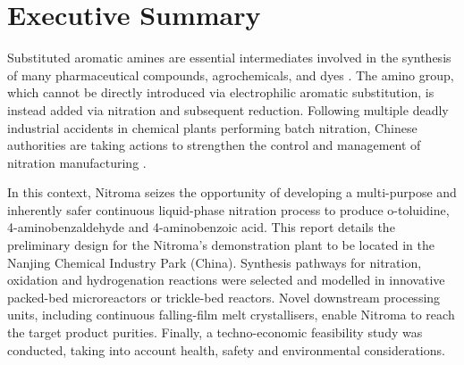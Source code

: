 \section*{Executive Summary}
\label{sec:exec-summary}

\noindent Substituted aromatic amines are essential intermediates involved in the synthesis of many pharmaceutical compounds, agrochemicals, and dyes \cite{vogt_amines_2000}. The amino group, which cannot be directly introduced via electrophilic aromatic substitution, is instead added via nitration and subsequent reduction. Following multiple deadly industrial accidents in chemical plants performing batch nitration, Chinese authorities are taking actions to strengthen the control and management of nitration manufacturing \cite{el_diario_china_2019}.

In this context, Nitroma seizes the opportunity of developing a multi-purpose and inherently safer continuous liquid-phase nitration process to produce o-toluidine, 4-aminobenzaldehyde and 4-aminobenzoic acid. This report details the preliminary design for the Nitroma’s demonstration plant to be located in the Nanjing Chemical Industry Park (China). Synthesis pathways for nitration, oxidation and hydrogenation reactions were selected and modelled in innovative packed-bed microreactors or trickle-bed reactors. Novel downstream processing units, including continuous falling-film melt crystallisers, enable Nitroma to reach the target product purities. Finally, a techno-economic feasibility study was conducted, taking into account health, safety and environmental considerations.
